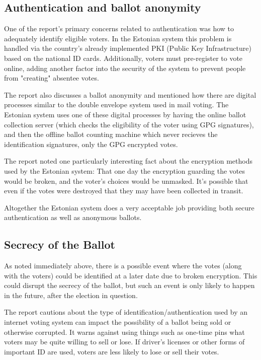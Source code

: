 \documentclass[a4paper, 11pt]{article} %
\begin{document}
\subsection*{Authentication and ballot anonymity}

One of the report's primary concerns related to authentication was how to adequately identify eligible voters. In the Estonian system this problem is handled via the country's already implemented PKI (Public Key Infrastructure) based on the national ID cards. Additionally, voters must pre-register to vote online, adding another factor into the security of the system to prevent people from "creating" absentee votes.

The report also discusses a ballot anonymity and mentioned how there are digital processes similar to the double envelope system used in mail voting. The Estonian system uses one of these digital processes by having the online ballot collection server (which checks the eligibility of the voter using GPG signatures), and then the offline ballot counting machine which never recieves the identification signatures, only the GPG encrypted votes.

The report noted one particularly interesting fact about the encryption methods used by the Estonian system: That one day the encryption guarding the votes would be broken, and the voter's choices would be unmasked. It's possible that even if the votes were destroyed that they may have been collected in transit.

Altogether the Estonian system does a very acceptable job providing both secure authentication as well as anonymous ballots.

\subsection*{Secrecy of the Ballot}

As noted immediately above, there is a possible event where the votes (along with the voters) could be identified at a later date due to broken encryption. This could disrupt the secrecy of the ballot, but such an event is only likely to happen in the future, after the election in question.

The report cautions about the type of identification/authentication used by an internet voting system can impact the possibility of a ballot being sold or otherwise corrupted. It warns against using things such as one-time pins what voters may be quite willing to sell or lose. If driver's licenses or other forms of important ID are used, voters are less likely to lose or sell their votes.
\end{document}
